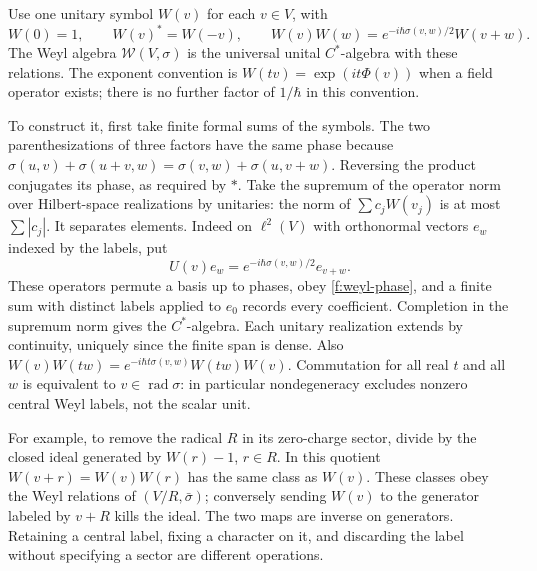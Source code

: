 \begin{definition}\label{f:weyl-relations}
Use one unitary symbol $W(v)$ for each $v\in V$, with
\begin{equation}
 W(0)=1,\qquad W(v)^*=W(-v),\qquad
 W(v)W(w)=e^{-i\hbar\sigma(v,w)/2}W(v+w).
 \label{f:weyl-phase}
\end{equation}
The Weyl algebra $\mathcal W(V,\sigma)$ is the universal unital $C^*$-algebra with these relations. The exponent convention is $W(tv)=\exp(it\Phi(v))$ when a field operator exists; there is no further factor of $1/\hbar$ in this convention.
\end{definition}
To construct it, first take finite formal sums of the symbols. The two parenthesizations of three factors have the same phase because $\sigma(u,v)+\sigma(u+v,w)=\sigma(v,w)+\sigma(u,v+w)$. Reversing the product conjugates its phase, as required by $*$. Take the supremum of the operator norm over Hilbert-space realizations by unitaries: the norm of $\sum c_j W(v_j)$ is at most $\sum |c_j|$. It separates elements. Indeed on $\ell^2(V)$ with orthonormal vectors $e_w$ indexed by the labels, put
\[
 U(v)e_w=e^{-i\hbar\sigma(v,w)/2}e_{v+w}.
\]
These operators permute a basis up to phases, obey \eqref{f:weyl-phase}, and a finite sum with distinct labels applied to $e_0$ records every coefficient. Completion in the supremum norm gives the $C^*$-algebra. Each unitary realization extends by continuity, uniquely since the finite span is dense. Also $W(v)W(tw)=e^{-i\hbar t\sigma(v,w)}W(tw)W(v)$. Commutation for all real $t$ and all $w$ is equivalent to $v\in\operatorname{rad}\sigma$: in particular nondegeneracy excludes nonzero central Weyl labels, not the scalar unit.

For example, to remove the radical $R$ in its zero-charge sector, divide by the closed ideal generated by $W(r)-1$, $r\in R$. In this quotient $W(v+r)=W(v)W(r)$ has the same class as $W(v)$. These classes obey the Weyl relations of $(V/R,\bar\sigma)$; conversely sending $W(v)$ to the generator labeled by $v+R$ kills the ideal. The two maps are inverse on generators. Retaining a central label, fixing a character on it, and discarding the label without specifying a sector are different operations.

